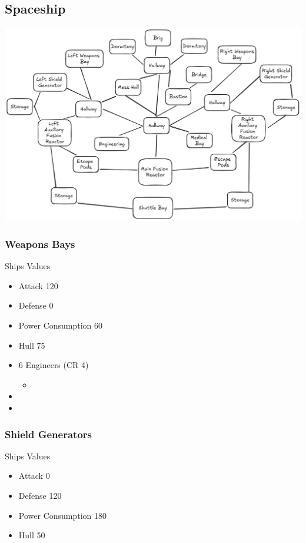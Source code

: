 \documentclass[11pt]{article}
\begin{document}
{\subsection{Spaceship}
\label{sec:orga0c2741}


\begin{center}
\includegraphics[width=.9\linewidth]{images/Space Ship.png}
\end{center}
\subsubsection{Weapons Bays}
\label{sec:org73d7506}
Ships Values
\begin{itemize}
\item Attack 120
\item Defense 0
\item Power Consumption 60
\item Hull 75

\item 6 Engineers (CR 4)
\begin{itemize}
\item {}
\end{itemize}
\item {}
\item {}
\end{itemize}
\subsubsection{Shield  Generators}
\label{sec:org8797df2}
Ships Values
\begin{itemize}
\item Attack 0
\item Defense 120
\item Power Consumption 180
\item Hull 50


\end{itemize}}
\end{document}

